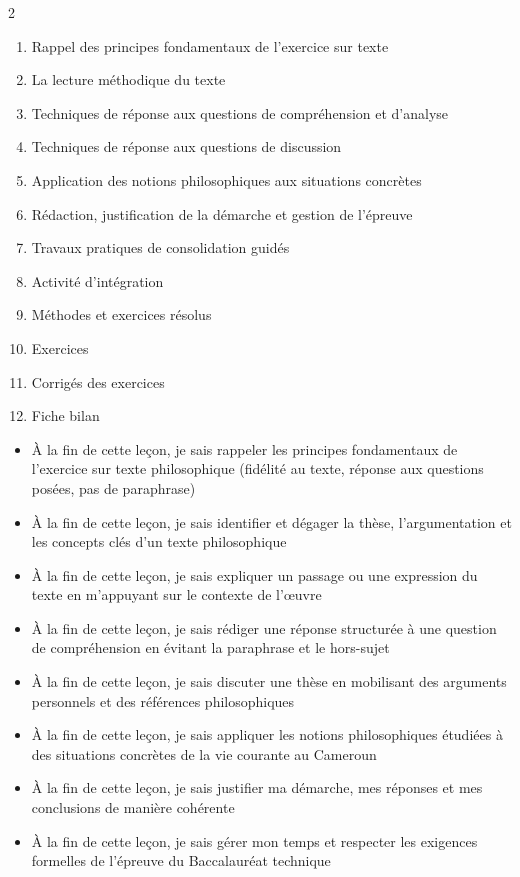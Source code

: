 \documentclass[11pt]{article}
\begin{document}
\begin{sommaire}
\begin{multicols}{2}
\begin{enumerate}
\item Rappel des principes fondamentaux de l'exercice sur texte
\item La lecture méthodique du texte
\item Techniques de réponse aux questions de compréhension et d'analyse
\item Techniques de réponse aux questions de discussion
\item Application des notions philosophiques aux situations concrètes
\item Rédaction, justification de la démarche et gestion de l'épreuve
\item Travaux pratiques de consolidation guidés
\item Activité d'intégration
\item Méthodes et exercices résolus
\item Exercices
\item Corrigés des exercices
\item Fiche bilan
\end{enumerate}
\end{multicols}
\end{sommaire}

\begin{objectifs}
\begin{itemize}
\item À la fin de cette leçon, je sais rappeler les principes fondamentaux de l'exercice sur texte philosophique (fidélité au texte, réponse aux questions posées, pas de paraphrase)
\item À la fin de cette leçon, je sais identifier et dégager la thèse, l'argumentation et les concepts clés d'un texte philosophique
\item À la fin de cette leçon, je sais expliquer un passage ou une expression du texte en m'appuyant sur le contexte de l'œuvre
\item À la fin de cette leçon, je sais rédiger une réponse structurée à une question de compréhension en évitant la paraphrase et le hors-sujet
\item À la fin de cette leçon, je sais discuter une thèse en mobilisant des arguments personnels et des références philosophiques
\item À la fin de cette leçon, je sais appliquer les notions philosophiques étudiées à des situations concrètes de la vie courante au Cameroun
\item À la fin de cette leçon, je sais justifier ma démarche, mes réponses et mes conclusions de manière cohérente
\item À la fin de cette leçon, je sais gérer mon temps et respecter les exigences formelles de l'épreuve du Baccalauréat technique
\end{itemize}
\end{objectifs}
\end{document}
